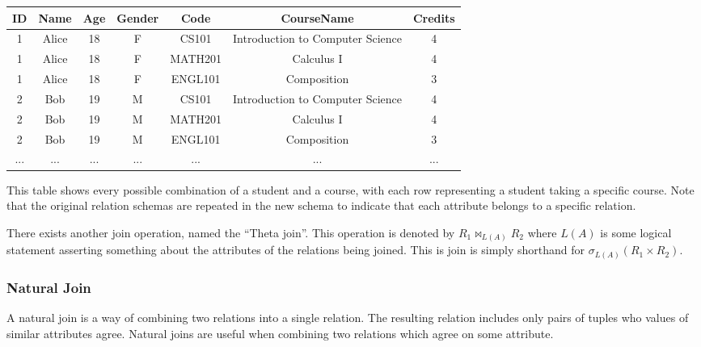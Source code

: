 \documentclass{report}
\begin{document}
{\begin{center}
    \begin{tabular}{|c|c|c|c|c|c|c|}
        \hline
        ID & Name & Age & Gender & Code & CourseName & Credits \\
        \hline
        1 & Alice & 18 & F & CS101 & Introduction to Computer Science & 4 \\
        \hline
        1 & Alice & 18 & F & MATH201 & Calculus I & 4 \\
        \hline
        1 & Alice & 18 & F & ENGL101 & Composition & 3 \\
        \hline
        2 & Bob & 19 & M & CS101 & Introduction to Computer Science & 4 \\
        \hline
        2 & Bob & 19 & M & MATH201 & Calculus I & 4 \\
        \hline
        2 & Bob & 19 & M & ENGL101 & Composition & 3 \\
        \hline
        ... & ... & ... & ... & ... & ... & ... \\
        \hline
    \end{tabular}
\end{center}


This table shows every possible combination of a student and a course, with each row representing a student taking a specific course. Note that the original relation schemas are repeated in the new schema to indicate that each attribute belongs to a specific relation.}

        \begin{note}
            There exists another join operation, named the ``Theta join''. This operation is denoted by $R_1 \bowtie_{L(A)} R_2$ where $L(A)$ is some logical statement asserting something about the attributes of the relations being joined. This is join is simply shorthand for $\sigma_{L(A)}(R_1 \times R_2)$.
        \end{note}


        \subsubsection{Natural Join}

        A natural join is a way of combining two relations into a single relation. The resulting relation includes only pairs of tuples who values of similar attributes agree. Natural joins are useful when combining two relations which agree on some attribute. 
\end{document}
